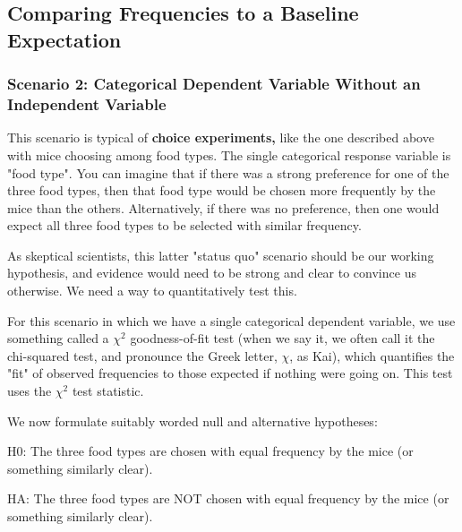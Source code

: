 \documentclass[
]{book}
\begin{document}
\hypertarget{comparing-frequencies-to-a-baseline-expectation}{%
\subsection*{Comparing Frequencies to a Baseline Expectation}\label{comparing-frequencies-to-a-baseline-expectation}}

\hypertarget{scenario-2-categorical-dependent-variable-without-an-independent-variable}{%
\subsubsection*{Scenario 2: Categorical Dependent Variable Without an Independent Variable}\label{scenario-2-categorical-dependent-variable-without-an-independent-variable}}

This scenario is typical of \textbf{choice experiments,} like the one described above with mice choosing among food types. The single categorical response variable is "food type". You can imagine that if there was a strong preference for one of the three food types, then that food type would be chosen more frequently by the mice than the others. Alternatively, if there was no preference, then one would expect all three food types to be selected with similar frequency.

As skeptical scientists, this latter "status quo" scenario should be our working hypothesis, and evidence would need to be strong and clear to convince us otherwise. We need a way to quantitatively test this.

For this scenario in which we have a single categorical dependent variable, we use something called a \(\chi{^2}\) goodness-of-fit test (when we say it, we often call it the chi-squared test, and pronounce the Greek letter, \(\chi\), as Kai), which quantifies the "fit" of observed frequencies to those expected if nothing were going on. This test uses the \(\chi{^2}\) test statistic.

We now formulate suitably worded null and alternative hypotheses:

H0: The three food types are chosen with equal frequency by the mice (or something similarly clear).

HA: The three food types are NOT chosen with equal frequency by the mice (or something similarly clear).
\end{document}
